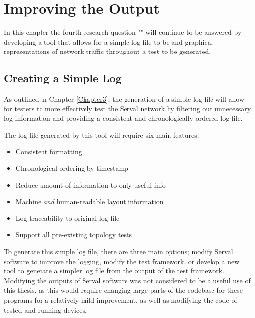 \chapter{Improving the Output} %

\label{Chapter5} %



In this chapter the fourth research question "\fourthRQ" will continue to be answered by developing a tool that allows for a simple log file to be and graphical representations of network traffic throughout a test to be generated.


\section{Creating a Simple Log}
As outlined in Chapter \ref{Chapter3}, the generation of a simple log file will allow for testers to more effectively test the Serval network by filtering out unnecessary log information and providing a consistent and chronologically ordered log file.

The log file generated by this tool will require six main features.
\begin{itemize}
    \item Consistent formatting
    \item Chronological ordering by timestamp
    \item Reduce amount of information to only useful info
    \item Machine \emph{and} human-readable layout information
    \item Log traceability to original log file
    \item Support all pre-existing topology tests
\end{itemize}

To generate this simple log file, there are three main options; modify Serval software to improve the logging, modify the test framework, or develop a new tool to generate a simpler log file from the output of the test framework.
Modifying the outputs of Serval software was not considered to be a useful use of this thesis, as this would require changing large parts of the codebase for these programs for a relatively mild improvement, as well as modifying the code of tested and running devices.

